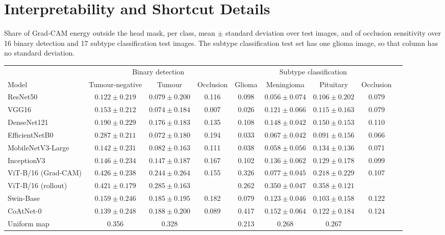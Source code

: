 \documentclass[a4paper,fleqn]{cas-sc}
\begin{document}
\section{Interpretability and Shortcut Details}
\label{sec:supp-interp}

\begin{heretable}
\centering
\caption{Share of Grad-CAM energy outside the head mask, per class, mean $\pm$ standard deviation over test images, and of occlusion sensitivity over 16 binary detection and 17 subtype classification test images. The subtype classification test set has one glioma image, so that column has no standard deviation.}
\label{tab:energy}
\scriptsize
\setlength{\tabcolsep}{3pt}
\begin{tabular*}{\textwidth}{@{\extracolsep{\fill}}lcccccccc@{}}
\toprule
 & \multicolumn{3}{c}{Binary detection} & \multicolumn{4}{c}{Subtype classification} \\
\cmidrule(lr){2-4}\cmidrule(l){5-8}
Model & Tumour-negative & Tumour & Occlusion & Glioma & Meningioma & Pituitary & Occlusion \\
\midrule
ResNet50 & $0.122\pm 0.219$ & $0.079\pm 0.200$ & 0.116 & 0.098 & $0.056\pm 0.074$ & $0.106\pm 0.202$ & 0.079 \\
VGG16 & $0.153\pm 0.212$ & $0.074\pm 0.184$ & 0.007 & 0.026 & $0.121\pm 0.066$ & $0.115\pm 0.163$ & 0.079 \\
DenseNet121 & $0.190\pm 0.229$ & $0.176\pm 0.183$ & 0.135 & 0.108 & $0.148\pm 0.042$ & $0.150\pm 0.153$ & 0.110 \\
EfficientNetB0 & $0.287\pm 0.211$ & $0.072\pm 0.180$ & 0.194 & 0.033 & $0.067\pm 0.042$ & $0.091\pm 0.156$ & 0.066 \\
MobileNetV3-Large & $0.142\pm 0.231$ & $0.082\pm 0.163$ & 0.111 & 0.038 & $0.058\pm 0.056$ & $0.134\pm 0.136$ & 0.071 \\
InceptionV3 & $0.146\pm 0.234$ & $0.147\pm 0.187$ & 0.167 & 0.102 & $0.136\pm 0.062$ & $0.129\pm 0.178$ & 0.099 \\
ViT-B/16 (Grad-CAM) & $0.426\pm 0.238$ & $0.244\pm 0.264$ & 0.155 & 0.326 & $0.077\pm 0.045$ & $0.218\pm 0.229$ & 0.107 \\
ViT-B/16 (rollout) & $0.421\pm 0.179$ & $0.285\pm 0.163$ & & 0.262 & $0.350\pm 0.047$ & $0.358\pm 0.121$ & \\
Swin-Base & $0.159\pm 0.246$ & $0.185\pm 0.195$ & 0.182 & 0.079 & $0.123\pm 0.046$ & $0.103\pm 0.158$ & 0.122 \\
CoAtNet-0 & $0.139\pm 0.248$ & $0.188\pm 0.200$ & 0.089 & 0.417 & $0.152\pm 0.064$ & $0.122\pm 0.184$ & 0.124 \\
Uniform map & 0.356 & 0.328 & & 0.213 & 0.268 & 0.267 & \\
\bottomrule
\end{tabular*}
\end{heretable}
\end{document}
